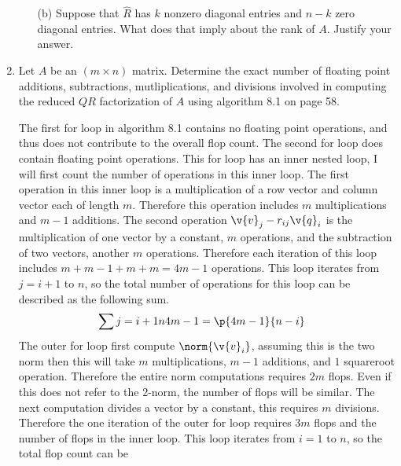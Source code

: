 \documentclass[11pt]{article}
\begin{document}
\begin{enumerate}
\begin{enumerate}
            \item[(b)]
                Suppose that $\hat{R}$ has $k$ nonzero diagonal entries and
                $n - k$ zero diagonal entries.
                What does that imply about the rank of $A$.
                Justify your answer.
        \end{enumerate}

    \item %
        Let $A$ be an $(m \times n)$ matrix.
        Determine the exact number of floating point additions, subtractions,
        mutliplications, and divisions involved in computing the reduced $QR$
        factorization of $A$ using algorithm 8.1 on page 58.

        The first for loop in algorithm 8.1 contains no floating point
        operations, and thus does not contribute to the overall flop count.
        The second for loop does contain floating point operations.
        This for loop has an inner nested loop, I will first count the
        number of operations in this inner loop.
        The first operation in this inner loop is a multiplication of a row
        vector and column vector each of length $m$.
        Therefore this operation includes $m$ multiplications and $m-1$
        additions.
        The second operation $\v{v}_j - r_{ij} \v{q}_i$ is the multiplication
        of one vector by a constant, $m$ operations, and the subtraction of
        two vectors, another $m$ operations.
        Therefore each iteration of this loop includes
        $m + m - 1 + m + m = 4m - 1$ operations.
        This loop iterates from $j = i + 1$ to $n$, so the total number of
        operations for this loop can be described as the following sum.
        \begin{align*}
            \sum{j = i+1}{n}{4m - 1} &= \p{4m - 1}{n - i}
        \end{align*}
        The outer for loop first compute $\norm{\v{v}_i}$, assuming this is
        the two norm then this will take $m$ multiplications, $m - 1$ additions,
        and $1$ squareroot operation.
        Therefore the entire norm computations requires $2m$ flops.
        Even if this does not refer to the 2-norm, the number of flops will be
        similar.
        The next computation divides a vector by a constant, this requires $m$
        divisions.
        Therefore the one iteration of the outer for loop requires $3m$ flops
        and the number of flops in the inner loop.
        This loop iterates from $i = 1$ to $n$, so the total flop count can be

\end{enumerate}
\end{document}
